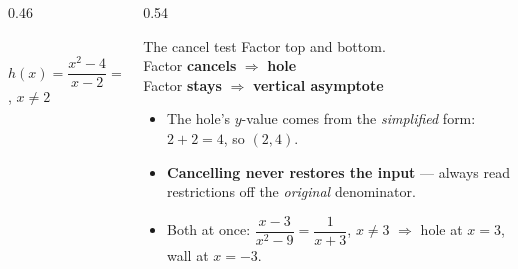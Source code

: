 \documentclass[aspectratio=169, 11pt]{beamer}
\newcommand{\lgrid}[4]{%
  \draw[step=1, linegray!45, thin] (#1,#3) grid (#2,#4);
  \draw[->, thick, charcoal] (#1,0)--(#2,0) node[below right, font=\tiny]{$x$};
  \draw[->, thick, charcoal] (0,#3)--(0,#4) node[left, font=\tiny]{$y$};}
\begin{document}
\begin{frame}[t, plain]
  \begin{columns}[T]
    \begin{column}{0.46\textwidth}
      \centering
      \\
      {\footnotesize $h(x)=\dfrac{x^2-4}{x-2}=x+2$, \; $x\neq2$}
    \end{column}
    \begin{column}{0.54\textwidth}
      \begin{block}{The cancel test}
        Factor top and bottom. \\[3pt]
        Factor \textbf{cancels} $\Rightarrow$ \textbf{hole} \\
        Factor \textbf{stays} $\Rightarrow$ \textbf{vertical asymptote}
      \end{block}
      \vspace{2pt}
      \begin{itemize}\setlength{\itemsep}{3pt}
        \item The hole's $y$-value comes from the \emph{simplified} form: $2+2=4$, so $(2,4)$.
        \item \textbf{Cancelling never restores the input} --- always read restrictions off the
              \emph{original} denominator.
        \item Both at once: $\dfrac{x-3}{x^2-9}=\dfrac{1}{x+3}$, $x\neq3$ $\Rightarrow$ hole at
              $x=3$, wall at $x=-3$.
      \end{itemize}
    \end{column}
  \end{columns}
\end{frame}
\end{document}
